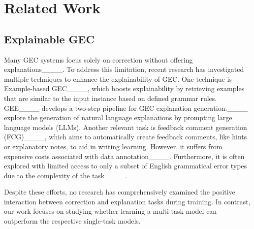 \section{Related Work}
\label{sec:related_works}

\subsection{Explainable GEC}
Many GEC systems focus solely on correction without offering explanations____. To address this limitation, recent research has investigated multiple techniques to enhance the explainability of GEC. One technique is Example-based GEC____, which boosts explainability by retrieving examples that are similar to the input instance based on defined grammar rules. GEE____ develops a two-step pipeline for GEC explanation generation.____ explore the generation of natural language explanations by prompting large language models (LLMs). Another relevant task is feedback comment generation (FCG)____, which aims to automatically create feedback comments, like hints or explanatory notes, to aid in writing learning. However, it suffers from expensive costs associated with data annotation____. Furthermore, it is often explored with limited access to only a subset of English grammatical error types due to the complexity of the task____.

Despite these efforts, no research has comprehensively examined the positive interaction between correction and explanation tasks during training. In contrast, our work focuses on studying whether learning a multi-task model can outperform the respective single-task models.


